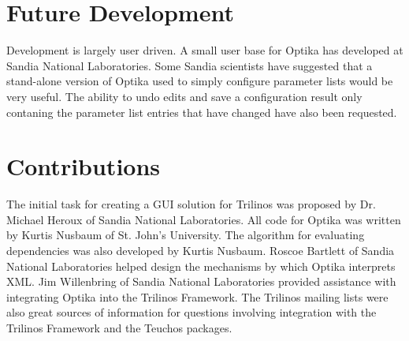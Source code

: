 \section{Future Development}
Development is largely user driven. A small user base for Optika has developed at Sandia National Laboratories. Some Sandia scientists 
have suggested that a stand-alone version of Optika used to simply configure parameter lists would be very useful. The ability to 
undo edits and save a configuration result only contaning the parameter list entries that have changed have also been requested.

\section{Contributions}
The initial task for creating a GUI solution for Trilinos was proposed by Dr. Michael Heroux of Sandia National Laboratories. 
All code for Optika was written by Kurtis Nusbaum of St. John's University. The algorithm for evaluating dependencies was also developed 
by Kurtis Nusbaum.  Roscoe Bartlett of Sandia National Laboratories helped design the mechanisms by which Optika interprets XML. 
Jim Willenbring of Sandia National Laboratories provided assistance with integrating Optika into the Trilinos Framework. The Trilinos 
mailing lists were also great sources of information for questions involving integration with the Trilinos Framework and the 
Teuchos packages.
